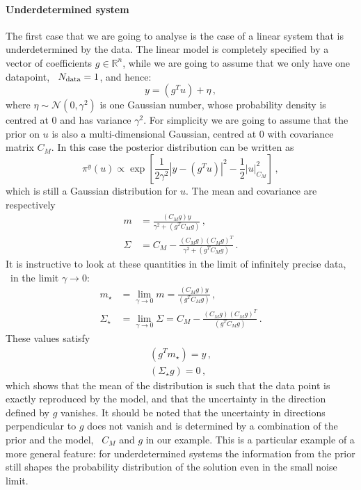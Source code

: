 \paragraph{Underdetermined system}
The first case that we are going to analyse is the case of a linear system that
is underdetermined by the data. The linear model is completely specified by a
vector of coefficients $g\in \mathbb{R}^n$, while we are going to assume that we
only have one datapoint, \ie\ $N_{\rm data}=1$, and hence:
\begin{equation}
  \label{eq:LinearModelEx}
  y = (g^T u) + \eta\, ,
\end{equation}
where $\eta \sim \mathcal{N}(0,\gamma^2)$ is one Gaussian number, whose
probability density is centred at $0$ and has variance $\gamma^2$. For
simplicity we are going to assume that the prior on $u$ is also a
multi-dimensional Gaussian, centred at $0$ with covariance matrix $C_M$. In
this case the posterior distribution can be written as
\begin{equation}
  \label{eq:GaussPostExplicit}
    \pi^y(u) \propto \exp \left[
    \frac{1}{2\gamma^2} \left|y - (g^T u) \right|^2 - \frac12 \left|
      u
    \right|_{C_M}^2 
    \right]\, ,
\end{equation}
which is still a Gaussian distribution for $u$. The mean and covariance are
respectively
\begin{align}
  m &= \frac{(C_M g) y}{\gamma^2 + (g^T C_M g)}\, , \\
  \Sigma &= C_M - 
  \frac{(C_M g) (C_M g)^T}{\gamma^2 + (g^T C_M g)}\, .
\end{align}
It is instructive to look at these quantities in the limit of infinitely precise data, \ie\ in the limit $\gamma\to 0$:
\begin{align}
  m_\star &= 
  \lim_{\gamma\to 0} m
  = \frac{(C_M g) y}{(g^T C_M g)}\, , \\
  \Sigma_\star &= 
  \lim_{\gamma\to 0} \Sigma 
  = C_M - 
  \frac{(C_M g) (C_M g)^T}{(g^T C_M g)}\, .
\end{align}
These values satisfy
\begin{align}
  (g^T m_\star) = y \, , \\
  (\Sigma_\star g) = 0 \, ,
\end{align}
which shows that the mean of the distribution is such that the data point is
exactly reproduced by the model, and that the uncertainty in the direction
defined by $g$ vanishes. It should be noted that the uncertainty in directions
perpendicular to $g$ does not vanish and is determined by a combination of the
prior and the model, \viz\ $C_M$ and $g$ in our example. This is a
particular example of a more general feature: for underdetermined systems the
information from the prior still shapes the probability distribution of the
solution even in the small noise limit.  

